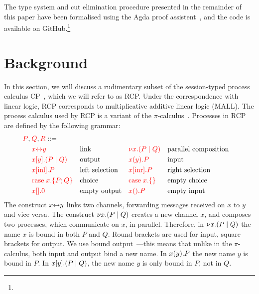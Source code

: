 \documentclass[a4paper,UKenglish]{lipics-v2016}
\begin{document}
The type system and cut elimination procedure presented in the remainder of this
paper have been formalised using the Agda proof assistent~\cite{norell2009}, and
the code is available on GitHub.\footnote{
}

\section{Background}
In this section, we will discuss a rudimentary subset of the session-typed
process calculus CP~\cite{wadler2012}, which we will refer to as RCP.
Under the correspondence with linear logic, RCP corresponds to multiplicative
additive linear logic (MALL).
The process calculus used by RCP is a variant of the
$\pi$-calculus~\cite{milner1992}. Processes in RCP are defined by the following
grammar:
\[
  \begin{aligned}
    \red{P},\:&\red{Q},\red{R} ::=\\
    & \red{\link{x}{y}}           &&\text{link}
    &&\red{\cut{x}(P \mid Q)}     &&\text{parallel composition}\\
    & \red{\send{x}{y}(P \mid Q)} &&\text{output}
    &&\red{\recv{x}{y}P}          &&\text{input}\\
    & \red{\inl{x}P}              &&\text{left selection}
    &&\red{\inr{x}P}              &&\text{right selection}\\
    & \red{\case{x}{P}{Q}}        &&\text{choice}
    &&\red{\case{x}{}{}}          &&\text{empty choice}\\
    & \red{\send{x}{}0}           &&\text{empty output}
    &&\red{\recv{x}{}P}           &&\text{empty input}\\
  \end{aligned}
\]
The construct ${x{\leftrightarrow}y}$ links two channels, forwarding messages received on
$x$ to $y$ and vice versa.
%
The construct ${\nu x.}{(P \mid Q)}$ creates a new channel $x$, and composes two
processes, which communicate on $x$, in parallel.
Therefore, in ${\nu x.}{(P \mid Q)}$ the name $x$ is bound in both $P$ and $Q$.
%
Round brackets are used for input, square brackets for output.
We use bound output~\cite{sangiorgi1996}---this means that unlike in the
$\pi$-calculus, both input and output bind a new name.
In ${x(y).}P$ the new name $y$ is bound in $P$.
In ${x[y].}{(P \mid Q)}$, the new name $y$ is only bound in $P$, not in $Q$.
\end{document}
